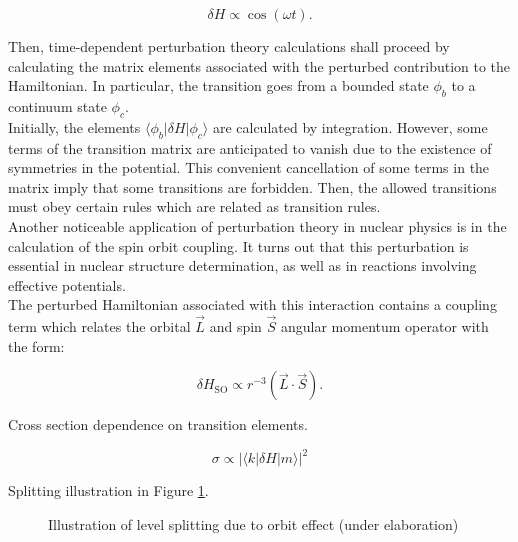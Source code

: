\documentclass[openany]{book}
\begin{document}
\begin{equation} \label{eq:perturbationTheory_radiativeTransition}
	\delta H \propto \cos(\omega t).
\end{equation}

Then, time-dependent perturbation theory calculations shall proceed by calculating the matrix elements associated with the perturbed contribution to the Hamiltonian. In particular, the transition goes from a bounded state $\phi_b$ to a  continuum state $\phi_c$.  \\

Initially, the elements $\langle \phi_b | \delta H| \phi_c \rangle$ are calculated by integration. However, some terms of the transition matrix are anticipated to vanish due to the existence of symmetries in the potential. This convenient cancellation of some terms in the matrix imply that some transitions are forbidden. Then, the allowed transitions must obey certain rules which are related as transition rules. \\

Another noticeable application of perturbation theory in nuclear physics is in the calculation of the spin orbit coupling. It turns out that this perturbation is essential in nuclear structure determination, as well as in reactions involving effective potentials. \\

The perturbed Hamiltonian associated with this interaction contains a coupling term which relates the orbital  $\vec L$ and spin $\vec S$ angular momentum operator with the form:

\begin{equation} \label{eq:perturbationTheory_spinOrbit}
	\delta H_{\mathrm{SO}} \propto r^{-3} (\vec L \cdot \vec S).
\end{equation}

Cross section dependence on transition elements.

\begin{equation} \label{eq:perturbationTheory_crossSection}
	\sigma \propto |\langle k | \delta H|m \rangle|^2
\end{equation}

Splitting illustration in Figure \ref{fig:spinOrbitSplitting}.

\begin{figure}[H]
	
	\caption[Spin orbit splitting representation]{Illustration of level splitting due to orbit effect (under elaboration)}
	\label{fig:spinOrbitSplitting}
\end{figure}
\end{document}
